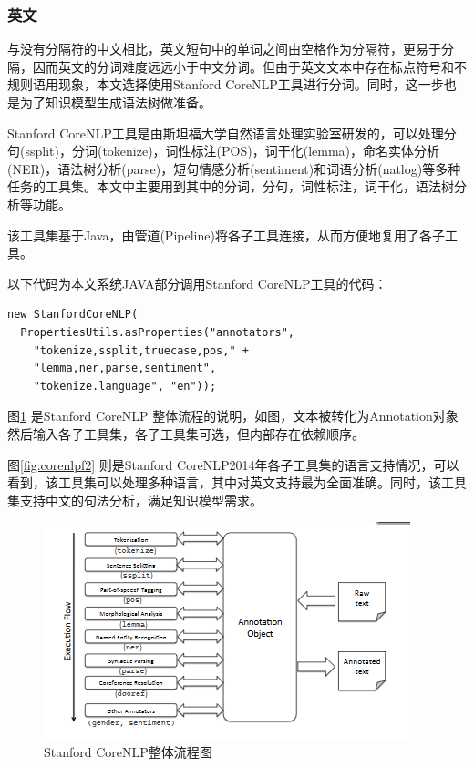 \subsubsection{英文}
与没有分隔符的中文相比，英文短句中的单词之间由空格作为分隔符，更易于分隔，因而英文的分词难度远远小于中文分词。但由于英文文本中存在标点符号和不规则语用现象，本文选择使用Stanford CoreNLP工具进行分词。同时，这一步也是为了知识模型生成语法树做准备。\par
Stanford CoreNLP工具是由斯坦福大学自然语言处理实验室研发的\cite{corenlp}，可以处理分句(ssplit)，分词(tokenize)，词性标注(POS)，词干化(lemma)，命名实体分析(NER)，语法树分析(parse)，短句情感分析(sentiment)和词语分析(natlog)等多种任务的工具集。本文中主要用到其中的分词，分句，词性标注，词干化，语法树分析等功能。\par
该工具集基于Java，由管道(Pipeline)将各子工具连接，从而方便地复用了各子工具。\par
以下代码为本文系统JAVA部分调用Stanford CoreNLP工具的代码：\par
\lstset{language=java}
\begin{lstlisting}
new StanfordCoreNLP(
  PropertiesUtils.asProperties("annotators",
    "tokenize,ssplit,truecase,pos," + 
    "lemma,ner,parse,sentiment",
    "tokenize.language", "en"));
\end{lstlisting}

图\ref{fig:corenlpf1} \cite{corenlp} 是Stanford CoreNLP 整体流程的说明，如图，文本被转化为Annotation对象然后输入各子工具集，各子工具集可选，但内部存在依赖顺序。\par
图\ref{fig:corenlpf2} \cite{corenlp} 则是Stanford CoreNLP2014年各子工具集的语言支持情况，可以看到，该工具集可以处理多种语言，其中对英文支持最为全面准确。同时，该工具集支持中文的句法分析，满足知识模型需求。

\begin{figure}[!htbp]
\begin{center}
\includegraphics[width=\textwidth]{graphic/stanfordcorenlpf1.PNG}
\caption{Stanford CoreNLP整体流程图 \label{fig:corenlpf1}}
\end{center}
\end{figure}


